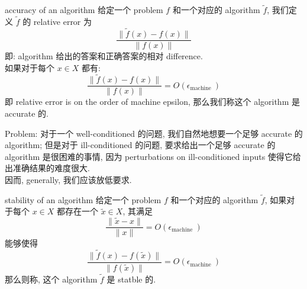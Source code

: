 \documentclass[lang=cn,11pt]{elegantbook}
\begin{document}
\begin{definition}{accuracy of an algorithm}
给定一个 problem $f$ 和一个对应的 algorithm $\tilde{f}$, 我们定义 $\tilde{f}$ 的 relative error 为$$
\frac{\|\tilde{f}(x)-f(x)\|}{\|f(x)\|}
$$
  即: algorithm 给出的答案和正确答案的相对 difference.\\
如果对于每个 $x\in X$ 都有: $$
\frac{\|\tilde{f}(x)-f(x)\|}{\|f(x)\|}=O\left(\epsilon_{\text {machine }}\right)
$$
即 relative error is on the order of machine epsilon, 那么我们称这个 algorithm 是 accurate 的.
\end{definition}
Problem: 对于一个 well-conditioned 的问题, 我们自然地想要一个足够 accurate 的 algorithm; 但是对于 ill-conditioned 的问题, 要求给出一个足够 accurate 的 algorithm 是很困难的事情, 因为 perturbations on ill-conditioned inputs 使得它给出准确结果的难度很大.\\
因而, generally, 我们应该放低要求.
\begin{definition}{stability of an algorithm}
    给定一个 problem $f$ 和一个对应的 algorithm $\tilde{f}$, 如果对于每个 $x \in X$ 都存在一个 $\tilde{x} \in X$, 其满足$$
\frac{\|\tilde{x}-x\|}{\|x\|}=O\left(\epsilon_{\text {machine }}\right)
$$能够使得  $$
\frac{\|\tilde{f}(x)-f(\tilde{x})\|}{\|f(\tilde{x})\|}=O\left(\epsilon_{\text {machine }}\right)
$$那么则称, 这个 algorithm $\tilde{f}$ 是 statble 的.
\end{definition}
\end{document}
